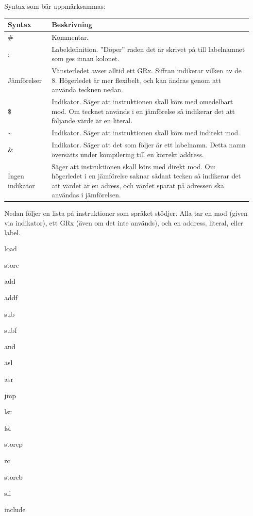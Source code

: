 \documentclass[]{article}
\begin{document}
\noindent
Syntax som bär uppmärksammas:\\

\begin{tabular}{p{2.5cm} p{8.5cm}}
\textbf{Syntax} & \textbf{Beskrivning}\\
\hline
\# & Kommentar.\\
: & Labeldefinition. ''Döper'' raden det är skrivet på till labelnamnet som ges innan kolonet.\\
Jämförelser & Vänsterledet avser alltid ett GRx. Siffran indikerar vilken av de 8. Högerledet är mer flexibelt, och kan ändras genom att använda tecknen nedan.\\
\$ & Indikator. Säger att instruktionen skall körs med omedelbart mod. Om tecknet används i en jämförelse så indikerar det att följande värde är en literal.\\
\~{ }  & Indikator. Säger att instruktionen skall körs med indirekt mod.\\
\& & Indikator. Säger att det som följer är ett labelnamn. Detta namn översätts under kompilering till en korrekt address.\\
Ingen indikator & Säger att instruktionen skall körs med direkt mod. Om högerledet i en jämförelse saknar sådant tecken så indikerar det att värdet är en adress, och värdet sparat på adressen ska användas i jämförelsen.\\
\end{tabular}

\noindent
Nedan följer en lista på instruktioner som språket stödjer. Alla tar en mod (given via indikator), ett GRx (även om det inte används), och en address, literal, eller label.

\begin{multicols}{3}
\begin{itemize*}
\item load
\item store
\item add
\item addf
\item sub
\item subf
\item and
\item asl
\item asr
\item jmp
\item lsr
\item lsl
\item storep
\item rc
\item storeb
\item sli
\item include
\end{itemize*}
\end{multicols}
\end{document}
